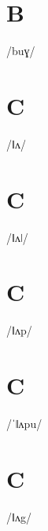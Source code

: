 \documentclass[10pt,a4paper,twoside]{book}
\begin{document}
\section*{B}

\begin{multicols}{3}
 {/buɣ/} {}
\end{multicols}

\section*{C}

\begin{multicols}{3}
 {/ǁʌ/} {}
\end{multicols}

\section*{C}

\begin{multicols}{3}
 {/ǁʌǀ/} {}
\end{multicols}

\section*{C}

\begin{multicols}{3}
 {/ǁʌp/} {}
\end{multicols}

\section*{C}

\begin{multicols}{3}
 {/ˈǁʌpu/} {}
\end{multicols}

\section*{C}

\begin{multicols}{3}
 {/ǁʌg/} {}
\end{multicols}
\end{document}
